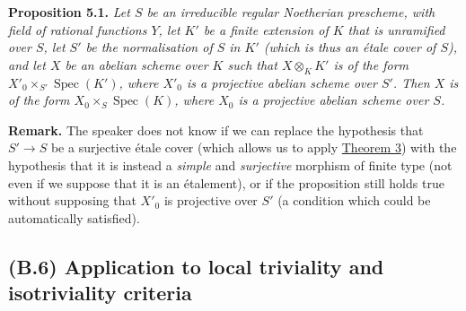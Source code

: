 \documentclass{article}
\newenvironment{itenv}[1]
  {\phantomsection\par\smallskip\noindent\textbf{#1.}\itshape}
  {\par\smallskip}
\newenvironment{rmenv}[1]
  {\phantomsection\par\smallskip\noindent\textbf{#1.}\rmfamily}
  {\par\smallskip}
\theoremstyle{definition}
\theoremstyle{definition}
\theoremstyle{definition}
\theoremstyle{definition}
\theoremstyle{remark}
\begin{document}
\leavevmode{}%
\begin{itenv}{Proposition 5.1}
Let \(S\) be an irreducible regular Noetherian prescheme, with field of rational functions \(Y\), let \(K'\) be a finite extension of \(K\) that is \emph{unramified over \(S\)}, let \(S'\) be the normalisation of \(S\) in \(K'\) (which is thus an étale cover of \(S\)), and let \(X\) be an abelian scheme over \(K\) such that \(X\otimes_K K'\) is of the form \(X'_0\times_{S'}\operatorname{Spec}(K')\), where \(X'_0\) is a projective abelian scheme over \(S'\).
Then \(X\) is of the form \(X_0\times_S\operatorname{Spec}(K)\), where \(X_0\) is a projective abelian scheme over \(S\).

\end{itenv}

\begin{rmenv}{Remark}
The speaker does not know if we can replace the hypothesis that \(S'\to S\) be a surjective étale cover (which allows us to apply \protect\hyperlink{fga-3-i-section-B.1-theorem-3}{Theorem 3}) with the hypothesis that it is instead a \emph{simple} and \emph{surjective} morphism of finite type (not even if we suppose that it is an étalement), or if the proposition still holds true without supposing that \(X'_0\) is projective over \(S'\) (a condition which could be automatically satisfied).

\end{rmenv}

\hypertarget{fga-3-i-section-B.6}{%
\subsection{(B.6) Application to local triviality and isotriviality criteria}\label{fga-3-i-section-B.6}}
\end{document}
